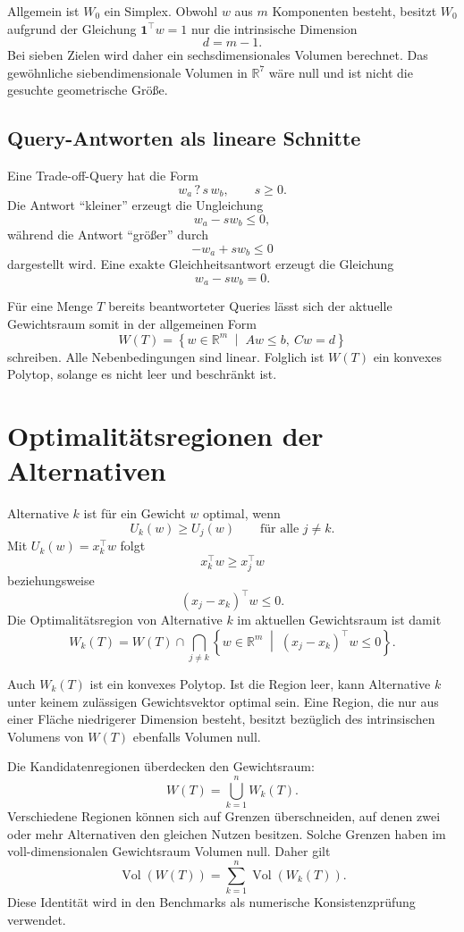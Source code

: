 \documentclass[11pt,a4paper]{article}
\newcommand{\R}{\mathbb{R}}
\newcommand{\Vol}{\operatorname{Vol}}
\begin{document}
Allgemein ist $W_0$ ein Simplex. Obwohl $w$ aus $m$ Komponenten besteht,
besitzt $W_0$ aufgrund der Gleichung $\boldsymbol{1}^\top w=1$ nur die
intrinsische Dimension
\[
  d=m-1.
\]
Bei sieben Zielen wird daher ein sechsdimensionales Volumen berechnet.
Das gewöhnliche siebendimensionale Volumen in $\R^7$ wäre null und ist nicht
die gesuchte geometrische Größe.

\subsection{Query-Antworten als lineare Schnitte}

Eine Trade-off-Query hat die Form
\[
  w_a\mathrel{?}s\,w_b,
  \qquad s\geq 0.
\]
Die Antwort ``kleiner'' erzeugt die Ungleichung
\[
  w_a-s w_b\leq 0,
\]
während die Antwort ``größer'' durch
\[
  -w_a+s w_b\leq 0
\]
dargestellt wird. Eine exakte Gleichheitsantwort erzeugt die Gleichung
\[
  w_a-s w_b=0.
\]

Für eine Menge $T$ bereits beantworteter Queries lässt sich der aktuelle
Gewichtsraum somit in der allgemeinen Form
\[
  W(T)
  =
  \left\{
    w\in\R^m
    \;\middle|\;
    Aw\leq b,
    \ Cw=d
  \right\}
\]
schreiben. Alle Nebenbedingungen sind linear. Folglich ist $W(T)$ ein
konvexes Polytop, solange es nicht leer und beschränkt ist.

\section{Optimalitätsregionen der Alternativen}

Alternative $k$ ist für ein Gewicht $w$ optimal, wenn
\[
  U_k(w)\geq U_j(w)
  \qquad\text{für alle }j\neq k.
\]
Mit $U_k(w)=x_k^\top w$ folgt
\[
  x_k^\top w\geq x_j^\top w
\]
beziehungsweise
\[
  (x_j-x_k)^\top w\leq 0.
\]
Die Optimalitätsregion von Alternative $k$ im aktuellen Gewichtsraum ist
damit
\[
  W_k(T)
  =
  W(T)
  \cap
  \bigcap_{j\neq k}
  \left\{
    w\in\R^m
    \;\middle|\;
    (x_j-x_k)^\top w\leq 0
  \right\}.
\]

Auch $W_k(T)$ ist ein konvexes Polytop. Ist die Region leer, kann Alternative
$k$ unter keinem zulässigen Gewichtsvektor optimal sein. Eine Region, die nur
aus einer Fläche niedrigerer Dimension besteht, besitzt bezüglich des
intrinsischen Volumens von $W(T)$ ebenfalls Volumen null.

Die Kandidatenregionen überdecken den Gewichtsraum:
\[
  W(T)=\bigcup_{k=1}^{n}W_k(T).
\]
Verschiedene Regionen können sich auf Grenzen überschneiden, auf denen zwei
oder mehr Alternativen den gleichen Nutzen besitzen. Solche Grenzen haben im
voll-dimensionalen Gewichtsraum Volumen null. Daher gilt
\[
  \Vol(W(T))
  =
  \sum_{k=1}^{n}\Vol(W_k(T)).
\]
Diese Identität wird in den Benchmarks als numerische Konsistenzprüfung
verwendet.
\end{document}
